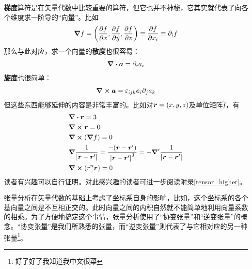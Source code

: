 \documentclass[12pt,a4paper,openany,twoside]{book}
\numberwithin{equation}{section}
\begin{document}
        \textbf{梯度}算符是在矢量代数中比较重要的算符，但它也并不神秘，它其实就代表了向各个维度求一阶导的“向量”。比如
        \begin{equation*}
          \grad{f}=\qty(\pdv{f}{x},\pdv{f}{y},\pdv{f}{z})\equiv\pdv{f}{x_i}\equiv\partial_i f
        \end{equation*} 
        那么与此对应，求一个向量的\textbf{散度}也很容易：
        \begin{equation*}
          \div{\vb*{a}} = \partial_i a_i 
        \end{equation*} 
        \textbf{旋度}也很简单：
        \begin{equation*}
          \curl{\vb*{a}} = \varepsilon_{ijk} \vb*{e}_i \partial_j a_k
        \end{equation*} 
        但这些东西能够延伸的内容是非常丰富的。比如对$\vb*{r} = (x,y,z)$及单位矩阵$\overleftrightarrow{I}$，有
        \begin{align}
          &\div{\vb*{r}} = 3 \\
          &\curl{\vb*{r}} = 0 \\
          &\curl{(\grad{f})} = 0 \\
          &\grad{\frac{1}{\abs{\vb*{r}-\vb*{r}'}}} = \frac{-\qty(\vb*{r}-\vb*{r}')}{\abs{\vb*{r}-\vb*{r}'}^3} = - \grad'{\frac{1}{\abs{\vb*{r}-\vb*{r}'}}} \\
          &\curl{\qty(r^n \vb*{r})} = 0 
        \end{align}
        读者有兴趣可以自行证明。对此感兴趣的读者可进一步阅读附录\ref{tensor_higher}。\\

        {}

        张量分析在矢量代数的基础上考虑了坐标系自身的影响，比如，这个坐标系的各个基向量之间是不互相正交的。此时向量之间的内积自然就不能简单地利用向量系数的相乘。为了方便地搞定这个事情，张量分析使用了“协变张量”和“逆变张量”的概念。“协变张量”是我们所熟悉的张量，而“逆变张量”则代表了与它相对应的另一种张量\footnote{\sout{好了好了我知道我中文很菜}}。
\end{document}
